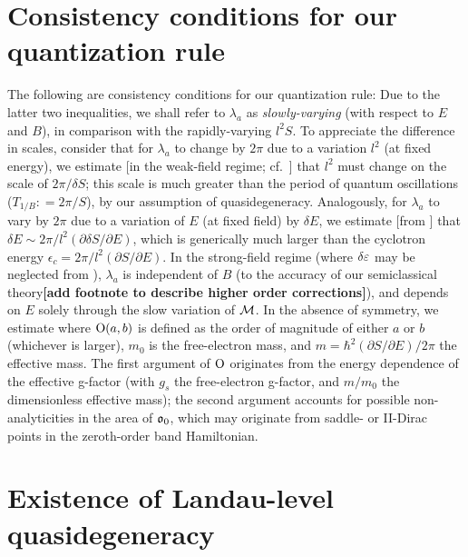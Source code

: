 \documentclass[aps, prb, showpacs, twocolumn, notitlepage, superscriptaddress]{revtex4-1}
\begin{document}
\section{Consistency conditions for our quantization rule}


The following are consistency conditions for our quantization rule:
Due to the latter two inequalities, we shall refer to $\lambda_{a}$ as \textit{slowly-varying} (with respect to $E$ and $B$), in comparison with the rapidly-varying $l^2S$. To appreciate the difference in scales, consider that for $\lambda_a$ to change by $2\pi$ due to a variation $l^2$ (at fixed energy), we estimate [in the weak-field regime; cf.\ ] that $l^2$ must change on the scale of $2\pi/\delta S$; this scale is much greater than the period of quantum oscillations ($T_{1/B}{:}{=}2\pi/ S$), by our assumption of quasidegeneracy. Analogously, for $\lambda_a$ to vary by $2\pi$ due to a variation of $E$ (at fixed field) by $\delta E$, we estimate [from ] that $\delta E {\sim} 2\pi/l^2 (\partial \delta S/\partial E)$, which is generically much larger than the cyclotron energy $\epsilon_c{=}2\pi/l^2 (\partial  S/\partial E)$. In the strong-field regime (where $\delta \varepsilon$ may be neglected from ), $\lambda_a$ is independent of $B$ (to the accuracy of our semiclassical theory\textbf{[add footnote to describe higher order corrections]}), and depends on $E$ solely through the slow variation of ${\cal M}$.  In the absence of symmetry, we  estimate 
where $\text{O}(a,b)$ is defined as the order of magnitude of either $a$ or $b$ (whichever is larger), $m_0$ is the free-electron mass, and $m{=}\hbar^2(\partial S/\partial E)/2\pi$ the effective mass. The first argument of $\text{O}$ originates from the energy dependence of the effective g-factor (with $g_s$ the free-electron g-factor, and $m/m_0$ the dimensionless effective mass); the second argument accounts for possible non-analyticities in the area of $\mathfrak{o}_0$, which may originate from saddle- or II-Dirac points in the zeroth-order band Hamiltonian.




\section{Existence of Landau-level quasidegeneracy}
\end{document}
